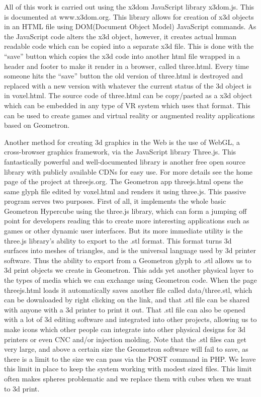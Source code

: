 All of this work is carried out using the x3dom JavaScript library x3dom.js.  This is documented at www.x3dom.org.  This library allows for creation of x3d objects in an HTML file using DOM(Document Object Model) JavaScript commands.  As the JavaScript code alters the x3d object, however, it creates actual human readable code which can be copied into a separate x3d file.  This is done with the ``save'' button which copies the x3d code into another html file wrapped in a header and footer to make it render in a browser, called three.html.  Every time someone hits the ``save'' button the old version of three.html is destroyed and replaced with a new version with whatever the current status of the 3d object is in voxel.html.  The source code of three.html can be copy/pasted as a x3d object which can be embedded in any type of VR system which uses that format.  This can be used to create games and virtual reality or augmented reality applications based on Geometron.

Another method for creating 3d graphics in the Web is the use of WebGL, a cross-browser graphics framework, via the JavaScript library Three.js.  This fantastically powerful and well-documented library is another free open source library with publicly available CDNs for easy use. For more details see the home page of the project at threejs.org.  The Geometron app threejs.html opens the same glyph file edited by voxel.html and renders it using three.js.  This passive program serves two purposes. First of all, it implements the whole basic Geometron Hypercube using the three.js library, which can form a jumping off point for developers reading this to create more interesting applications such as games or other dynamic user interfaces.  But its more immediate utility is the three.js library's ability to export to the .stl format.  This format turns 3d surfaces into meshes of triangles, and is the universal language used by 3d printer software.  Thus the ability to export from a Geometron glyph to .stl allows us to 3d print objects we create in Geometron.  This adds yet another physical layer to the types of media which we can exchange using Geometron code.  When the page threejs.html loads it automatically saves another file called data/three.stl, which can be downloaded by right clicking on the link, and that .stl file can be shared with anyone with a 3d printer to print it out.  That .stl file can also be opened with a lot of 3d editing software and integrated into other projects, allowing us to make icons which other people can integrate into other physical designs for 3d printers or even CNC and/or injection molding.  Note that the .stl files can get very large, and above a certain size the Geometron software will fail to save, as there is a limit to the size we can pass via the POST command in PHP.  We leave this limit in place to keep the system working with modest sized files.  This limit often makes spheres problematic and we replace them with cubes when we want to 3d print.

